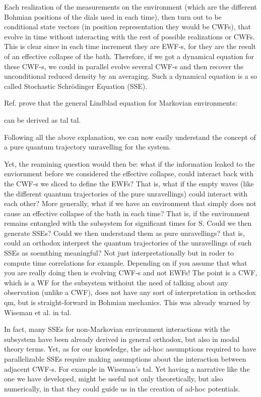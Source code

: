 \documentclass[11pt, a4paper]{article} %
\begin{document}
Each realization of the measurements on the environment (which are the different Bohmian positions of the dials used in each time), then turn out to be conditional state vectors (in position representation they would be CWFs), that evolve in time without interacting with the rest of possible realizations or CWFs. This is clear since in each time increment they are EWF-s, for they are the result of an effective collapse of the bath. Therefore, if we got a dynamical equation for these CWF-s, we could in parallel evolve several CWF-s and then recover the unconditional reduced density by an averaging. Such a dynamical equation is a so called Stochastic Schrödinger Equation (SSE).


Ref. \cite{mostGeneralMarkovian} prove that the general Lindblad equation for Markovian environments:


can be derived as tal tal.

Following all the above explanation, we can now easily understand the concept of a pure quantum trajectory unravelling for the system. 



Yet, the reamining question would then be: what if the information leaked to the enviornment before we considered the effective collapse, could interact back with the CWF-s we sliced to define the EWFs? That is, what if the empty waves (like the different quantum trajectories of the pure unravellings) could interact with each other? More generally, what if we have an environment that simply does not cause an effective collapse of the bath in each time? That is, if the environment remains entangled with the subsystem for significant times for S. Could we then generate SSEs? Could we then understand them as pure unravellings? that is, could an orthodox interpret the quantum trajectories of the unravellings of such SSEs as soemthing meaningful? Not just interpretationally but in roder to compute time correlations for example. 
Depending on if you assume that what you are really doing then is evolving CWF-s and not EWFs! The point is a CWF, which is a WF for the subsystem withoiut the need of talking about any observation (unlike a CWF), does not have any sort of interpretation in orthodox qm, but is straight-forward in Bohmian mechanics. This was already warned by Wiseman et al. in tal.

In fact, many SSEs for non-Markovian environment interactions with the subsystem have been already derived in general orthodox, but also in modal theory terms. Yet, as for our knowledge, the ad-hoc assumptions required to have parallelizable SSEs require making assumptions about the interaction between adjacent CWF-s. For example in Wiseman's tal. Yet having a narrative like the one we have developed, might be useful not only theoretically, but also numerically, in that they could guide us in the creation of ad-hoc potentials.
\end{document}
